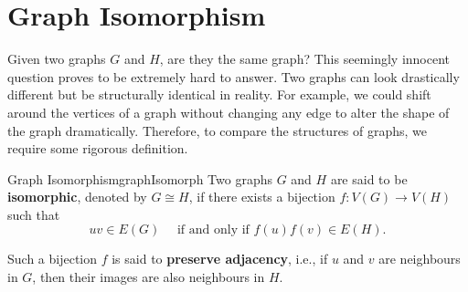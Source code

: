 \documentclass[math]{amznotes}
\theoremstyle{remark}
\newcommand{\0}{\mathbf{0}}
\newcommand{\1}{\mathbf{1}}
\begin{document}
\section{Graph Isomorphism}
Given two graphs $G$ and $H$, are they the same graph? This seemingly innocent question proves to be extremely hard to answer. Two graphs can look drastically different but be structurally identical in reality. For example, we could shift around the vertices of a graph without changing any edge to alter the shape of the graph dramatically. Therefore, to compare the structures of graphs, we require some rigorous definition.
\begin{dfnbox}{Graph Isomorphism}{graphIsomorph}
    Two graphs $G$ and $H$ are said to be {\color{red} \textbf{isomorphic}}, denoted by $G \cong H$, if there exists a bijection $f \colon V(G) \to V(H)$ such that
    \begin{equation*}
        uv \in E(G) \quad\textrm{ if and only if } f(u)f(v) \in E(H).
    \end{equation*}
\end{dfnbox}
Such a bijection $f$ is said to \textbf{preserve adjacency}, i.e., if $u$ and $v$ are neighbours in $G$, then their images are also neighbours in $H$.
\end{document}
